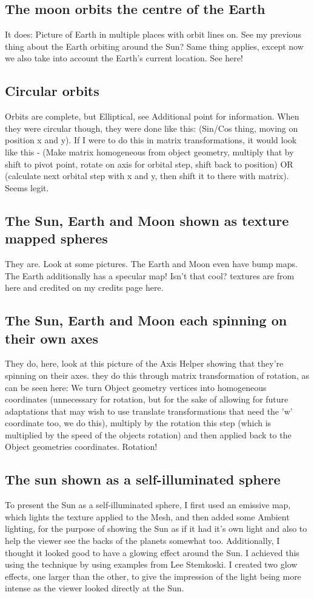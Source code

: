 \documentclass[12pt]{article}
\begin{document}
\subsection{The moon orbits the centre of the Earth}
It does: Picture of Earth in multiple places with orbit lines on. See my previous thing about the Earth orbiting around the Sun? Same thing applies, except now we also take into account the Earth's current location. See here!

\subsection{Circular orbits}
Orbits are complete, but Elliptical, see Additional point for information. When they were circular though, they were done like this: (Sin/Cos thing, moving on position x and y). If I were to do this in matrix transformations, it would look like this - (Make matrix homogeneous from object geometry, multiply that by shift to pivot point, rotate on axis for orbital step, shift back to position) OR (calculate next orbital step with x and y, then shift it to there with matrix). Seems legit.

\subsection{The Sun, Earth and Moon shown as texture mapped spheres}
They are. Look at some pictures. The Earth and Moon even have bump maps. The Earth additionally has a specular map! Isn't that cool? textures are from here and credited on my credits page here.

\subsection{The Sun, Earth and Moon each spinning on their own axes}
They do, here, look at this picture of the Axis Helper showing that they're spinning on their axes. they do this through matrix transformation of rotation, as can be seen here: We turn Object geometry vertices into homogeneous coordinates (unnecessary for rotation, but for the sake of allowing for future adaptations that may wish to use translate transformations that need the 'w' coordinate too, we do this), multiply by the rotation this step (which is multiplied by the speed of the objects rotation) and then applied back to the Object geometries coordinates. Rotation!

\subsection{The sun shown as a self-illuminated sphere}
To present the Sun as a self-illuminated sphere, I first used an emissive map, which lights the texture applied to the Mesh, and then added some Ambient lighting, for the purpose of showing the Sun as if it had it's own light and also to help the viewer see the backs of the planets somewhat too. Additionally, I thought it looked good to have a glowing effect around the Sun. I achieved this using the technique by using examples from Lee Stemkoski\cite{sunglow}. I created two glow effects, one larger than the other, to give the impression of the light being more intense as the viewer looked directly at the Sun. 
\end{document}
